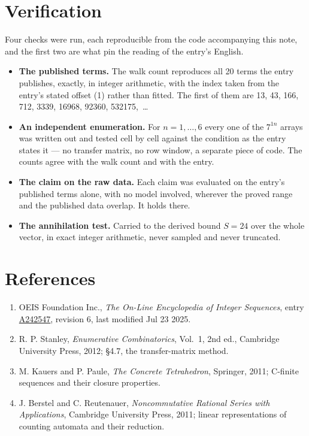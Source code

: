 \documentclass[11pt]{article}
\theoremstyle{definition}
\begin{document}
\section{Verification}

Four checks were run, each reproducible from the code accompanying this note, and the first two are what pin the reading of the entry's English.

\begin{itemize}

\item {\bfseries The published terms.} The walk count reproduces all 20 terms the entry publishes, exactly, in integer arithmetic, with the index taken from the entry's stated offset (1) rather than fitted. The first of them are 13, 43, 166, 712, 3339, 16968, 92360, 532175,~\dots

\item {\bfseries An independent enumeration.} For $n = 1,\dots,6$ every one of the $7^{1n}$ arrays was written out and tested cell by cell against the condition as the entry states it --- no transfer matrix, no row window, a separate piece of code. The counts agree with the walk count and with the entry.

\item {\bfseries The claim on the raw data.} Each claim was evaluated on the entry's published terms alone, with no model involved, wherever the proved range and the published data overlap. It holds there.

\item {\bfseries The annihilation test.} Carried to the derived bound $S = 24$ over the whole vector, in exact integer arithmetic, never sampled and never truncated.

\end{itemize}

\section{References}

\begin{enumerate}

\item OEIS Foundation Inc., \emph{The On-Line Encyclopedia of Integer Sequences}, entry \href{https://oeis.org/A242547}{A242547}, revision 6, last modified Jul 23 2025.

\item R. P. Stanley, \emph{Enumerative Combinatorics}, Vol.~1, 2nd ed., Cambridge University Press, 2012; \S4.7, the transfer-matrix method.

\item M. Kauers and P. Paule, \emph{The Concrete Tetrahedron}, Springer, 2011; C-finite sequences and their closure properties.

\item J. Berstel and C. Reutenauer, \emph{Noncommutative Rational Series with Applications}, Cambridge University Press, 2011; linear representations of counting automata and their reduction.

\end{enumerate}
\end{document}
